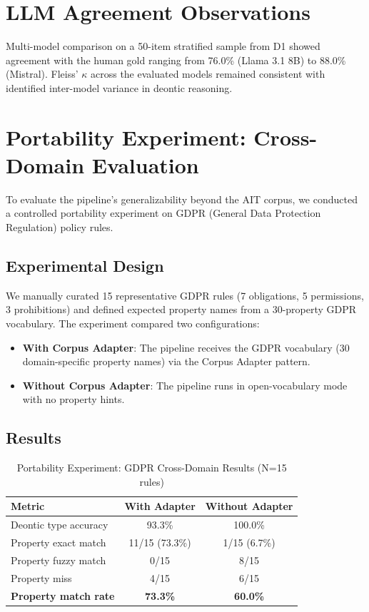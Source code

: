 \section{LLM Agreement Observations}
\label{sec:multi-llm-agreement}

Multi-model comparison on a 50-item stratified sample from D1 showed agreement with the human gold ranging from 76.0\% (Llama 3.1 8B) to 88.0\% (Mistral). Fleiss' $\kappa$ across the evaluated models remained consistent with identified inter-model variance in deontic reasoning.


\section{Portability Experiment: Cross-Domain Evaluation}
\label{sec:portability-experiment}

To evaluate the pipeline's generalizability beyond the AIT corpus, we conducted a controlled portability experiment on GDPR (General Data Protection Regulation) policy rules.

\subsection{Experimental Design}

We manually curated 15 representative GDPR rules (7 obligations, 5 permissions, 3 prohibitions) and defined expected property names from a 30-property GDPR vocabulary. The experiment compared two configurations:

\begin{itemize}
    \item \textbf{With Corpus Adapter}: The pipeline receives the GDPR vocabulary (30 domain-specific property names) via the Corpus Adapter pattern.
    \item \textbf{Without Corpus Adapter}: The pipeline runs in open-vocabulary mode with no property hints.
\end{itemize}

\subsection{Results}

\begin{table}[htbp]
\centering
\caption{Portability Experiment: GDPR Cross-Domain Results (N=15 rules)}
\label{tab:portability}
\begin{tabular}{lcc}
\toprule
\textbf{Metric} & \textbf{With Adapter} & \textbf{Without Adapter} \\
\midrule
Deontic type accuracy & 93.3\% & 100.0\% \\
Property exact match & 11/15 (73.3\%) & 1/15 (6.7\%) \\
Property fuzzy match & 0/15 & 8/15 \\
Property miss & 4/15 & 6/15 \\
\textbf{Property match rate} & \textbf{73.3\%} & \textbf{60.0\%} \\
\bottomrule
\end{tabular}
\end{table}

